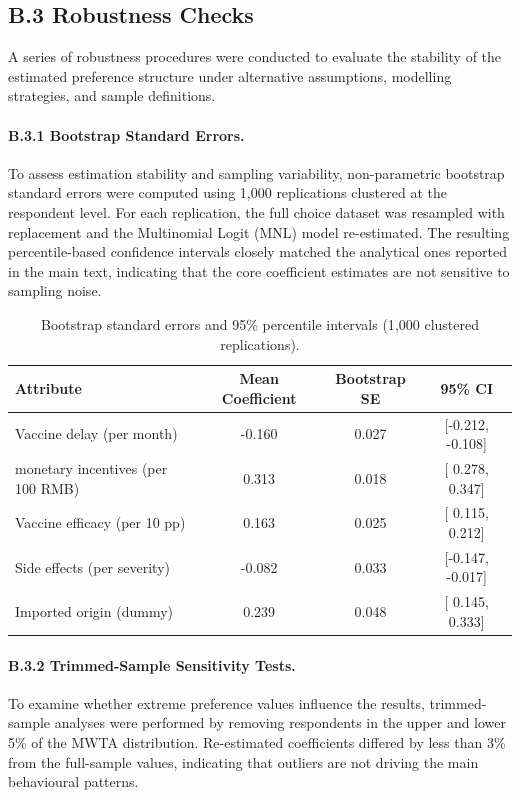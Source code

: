 \documentclass[12pt]{article}
\begin{document}
\subsection*{B.3 Robustness Checks}

A series of robustness procedures were conducted to evaluate the stability of the estimated 
preference structure under alternative assumptions, modelling strategies, and sample 
definitions.

\paragraph{B.3.1 Bootstrap Standard Errors.}
To assess estimation stability and sampling variability, non-parametric bootstrap standard 
errors were computed using 1{,}000 replications clustered at the respondent level. For each 
replication, the full choice dataset was resampled with replacement and the Multinomial Logit 
(MNL) model re-estimated. The resulting percentile-based confidence intervals closely matched 
the analytical ones reported in the main text, indicating that the core coefficient estimates 
are not sensitive to sampling noise.

\begin{table}[H]
\centering
\caption{Bootstrap standard errors and 95\% percentile intervals (1{,}000 clustered replications).}
\label{tab:bootstrap_se}
\begin{tabular}{lccc}
\toprule
Attribute & Mean Coefficient & Bootstrap SE & 95\% CI \\
\midrule
Vaccine delay (per month)       & -0.160 & 0.027 & [-0.212, -0.108] \\
monetary incentives (per 100 RMB)    &  0.313 & 0.018 & [ 0.278,  0.347] \\
Vaccine efficacy (per 10 pp)    &  0.163 & 0.025 & [ 0.115,  0.212] \\
Side effects (per severity)     & -0.082 & 0.033 & [-0.147, -0.017] \\
Imported origin (dummy)         &  0.239 & 0.048 & [ 0.145,  0.333] \\
\bottomrule
\end{tabular}
\end{table}

\paragraph{B.3.2 Trimmed-Sample Sensitivity Tests.}
To examine whether extreme preference values influence the results, trimmed-sample analyses 
were performed by removing respondents in the upper and lower 5\% of the MWTA distribution. 
Re-estimated coefficients differed by less than 3\% from the full-sample values, indicating 
that outliers are not driving the main behavioural patterns.
\end{document}

